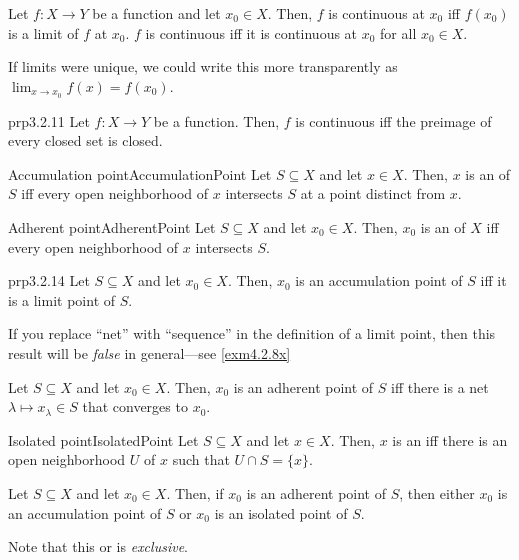 \begin{prp}{}{}
Let $f\colon X\rightarrow Y$ be a function and let $x_0\in X$.  Then, $f$ is continuous at $x_0$ iff $f(x_0)$ is a limit of $f$ at $x_0$.  $f$ is continuous iff it is continuous at $x_0$ for all $x_0\in X$.
\begin{rmk}
If limits were unique, we could write this more transparently as $\lim _{x\to x_0}f(x)=f(x_0)$.
\end{rmk}
\end{prp}
\begin{prp}{}{prp3.2.11}
Let $f\colon X\rightarrow Y$ be a function.  Then, $f$ is continuous iff the preimage of every closed set is closed.
\end{prp}
\begin{dfn}{Accumulation point}{AccumulationPoint}
Let $S\subseteq X$ and let $x\in X$.  Then, $x$ is an  of $S$ iff every open neighborhood of $x$ intersects $S$ at a point distinct from $x$.
\end{dfn}
\begin{dfn}{Adherent point}{AdherentPoint}
Let $S\subseteq X$ and let $x_0\in X$.  Then, $x_0$ is an  of $X$ iff every open neighborhood of $x$ intersects $S$.
\end{dfn}
\begin{prp}{}{prp3.2.14}
Let $S\subseteq X$ and let $x_0\in X$.  Then, $x_0$ is an accumulation point of $S$ iff it is a limit point of $S$.
\begin{rmk}
If you replace ``net'' with ``sequence'' in the definition of a limit point, then this result will be \emph{false} in general---see \cref{exm4.2.8x}
\end{rmk}
\end{prp}
\begin{prp}{}{}
Let $S\subseteq X$ and let $x_0\in X$.  Then, $x_0$ is an adherent point of $S$ iff there is a net $\lambda \mapsto x_{\lambda} \in S$ that converges to $x_0$.
\end{prp}
\begin{dfn}{Isolated point}{IsolatedPoint}
Let $S\subseteq X$ and let $x\in X$.  Then, $x$ is an  iff there is an open neighborhood $U$ of $x$ such that $U\cap S=\{ x\}$.
\end{dfn}
\begin{prp}{}{}
Let $S\subseteq X$ and let $x_0\in X$.  Then, if $x_0$ is an adherent point of $S$, then either $x_0$ is an accumulation point of $S$ or $x_0$ is an isolated point of $S$.
\begin{rmk}
Note that this or is \emph{exclusive}.
\end{rmk}
\end{prp}
